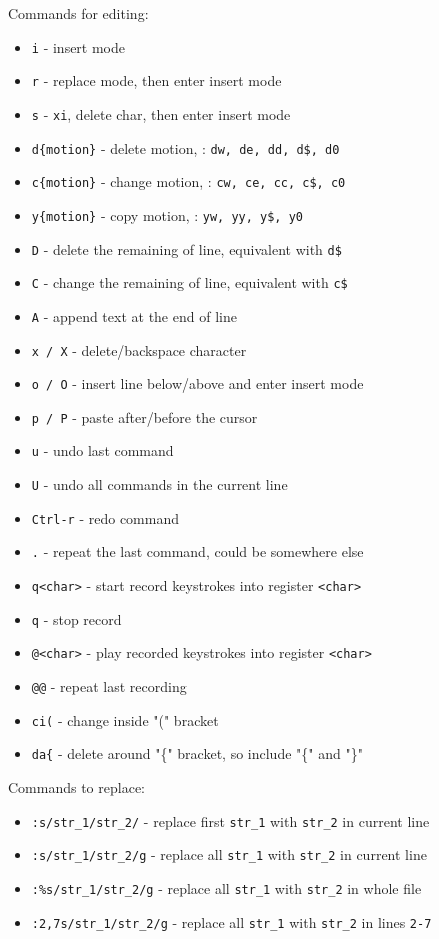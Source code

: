 Commands for editing:
\begin{itemize}
	\setlength\itemsep{0em}
	\item \verb|i| - insert mode
	\item \verb|r| - replace mode, then enter insert mode
	\item \verb|s| - \texttt{xi}, delete char, then enter insert mode
	\item \verb|d{motion}| - delete motion, \eg: \texttt{dw, de, dd, d\$, d0}
	\item \verb|c{motion}| - change motion, \eg: \texttt{cw, ce, cc, c\$, c0}
	\item \verb|y{motion}| - copy motion, \eg: \texttt{yw, yy, y\$, y0}
	\item \verb|D| - delete the remaining of line, equivalent with \texttt{d\$}
	\item \verb|C| - change the remaining of line, equivalent with \texttt{c\$}
	\item \verb|A| - append text at the end of line
	\item \verb|x / X| - delete/backspace character
	\item \verb|o / O| - insert line below/above and enter insert mode
	\item \verb|p / P| - paste after/before the cursor
	\item \verb|u| - undo last command
	\item \verb|U| - undo all commands in the current line
	\item \verb|Ctrl-r| - redo command
	\item \verb|.| - repeat the last command, could be somewhere else
	\item \verb|q<char>| - start record keystrokes into register \texttt{<char>}
	\item \verb|q| - stop record
	\item \verb|@<char>| - play recorded keystrokes into register \texttt{<char>}
	\item \verb|@@| - repeat last recording
	\item \verb|ci(| - change inside "(" bracket
	\item \verb|da{| - delete around "\{" bracket, so include "\{" and "\}"
\end{itemize}

Commands to replace:
\begin{itemize}
	\setlength\itemsep{0em}
	\item \verb|:s/str_1/str_2/| - replace first \texttt{str\_1} with \texttt{str\_2} in current line
	\item \verb|:s/str_1/str_2/g| - replace all \texttt{str\_1} with \texttt{str\_2} in current line
	\item \verb|:%s/str_1/str_2/g| - replace all \texttt{str\_1} with \texttt{str\_2} in whole file
	\item \verb|:2,7s/str_1/str_2/g| - replace all \texttt{str\_1} with \texttt{str\_2} in lines \texttt{2-7}
\end{itemize}

